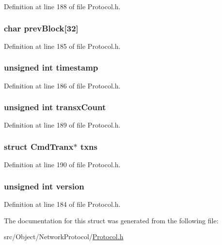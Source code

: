 Definition at line 188 of file Protocol.h.

\hypertarget{struct_cmd_block_a099897f937ebe9e9634c5098e38c7cab}{
\subsubsection[{prevBlock}]{\setlength{\rightskip}{0pt plus 5cm}char {\bf prevBlock}\mbox{[}32\mbox{]}}}
\label{struct_cmd_block_a099897f937ebe9e9634c5098e38c7cab}


Definition at line 185 of file Protocol.h.

\hypertarget{struct_cmd_block_ad4048a3c215cbfcdc127ada8e0fa5445}{
\subsubsection[{timestamp}]{\setlength{\rightskip}{0pt plus 5cm}unsigned int {\bf timestamp}}}
\label{struct_cmd_block_ad4048a3c215cbfcdc127ada8e0fa5445}


Definition at line 186 of file Protocol.h.

\hypertarget{struct_cmd_block_a74334da90ccc4ebde303deecbe77f9dd}{
\subsubsection[{transxCount}]{\setlength{\rightskip}{0pt plus 5cm}unsigned int {\bf transxCount}}}
\label{struct_cmd_block_a74334da90ccc4ebde303deecbe77f9dd}


Definition at line 189 of file Protocol.h.

\hypertarget{struct_cmd_block_a50142212678034606e6aa3304ea06fb7}{
\subsubsection[{txns}]{\setlength{\rightskip}{0pt plus 5cm}struct {\bf CmdTranx}$\ast$ {\bf txns}}}
\label{struct_cmd_block_a50142212678034606e6aa3304ea06fb7}


Definition at line 190 of file Protocol.h.

\hypertarget{struct_cmd_block_a5408ac5df4c170828874e1b10b4c35a0}{
\subsubsection[{version}]{\setlength{\rightskip}{0pt plus 5cm}unsigned int {\bf version}}}
\label{struct_cmd_block_a5408ac5df4c170828874e1b10b4c35a0}


Definition at line 184 of file Protocol.h.



The documentation for this struct was generated from the following file:\begin{DoxyCompactItemize}
\item 
src/Object/NetworkProtocol/\hyperlink{_protocol_8h}{Protocol.h}\end{DoxyCompactItemize}
